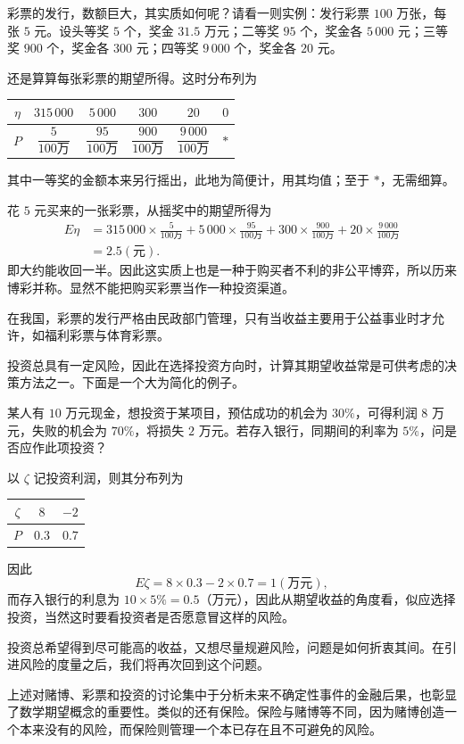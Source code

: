 \documentclass[../../main.tex]{subfiles}
\begin{document}
\begin{example}[彩票]\label{example:ch04-彩票}
彩票的发行，数额巨大，其实质如何呢？请看一则实例：发行彩票 $100$ 万张，每张 $5$ 元。设头等奖 $5$ 个，奖金 $31.5$ 万元；二等奖 $95$ 个，奖金各 $5\,000$ 元；三等奖 $900$ 个，奖金各 $300$ 元；四等奖 $9\,000$ 个，奖金各 $20$ 元。

还是算算每张彩票的期望所得。这时分布列为
\begin{center}
\begin{tabular}{c|ccccc}
$\eta$ & $315\,000$ & $5\,000$ & $300$ & $20$ & $0$\\
\hline
$P$ & $\dfrac{5}{100\text{万}}$ & $\dfrac{95}{100\text{万}}$ & $\dfrac{900}{100\text{万}}$ & $\dfrac{9\,000}{100\text{万}}$ & $*$
\end{tabular}
\end{center}
其中一等奖的金额本来另行摇出，此地为简便计，用其均值；至于 $*$，无需细算。

花 $5$ 元买来的一张彩票，从摇奖中的期望所得为
\begin{align*}
E\eta&=315\,000\times\frac{5}{100\text{万}}+5\,000\times\frac{95}{100\text{万}}
+300\times\frac{900}{100\text{万}}+20\times\frac{9\,000}{100\text{万}}\\
&=2.5(\text{元}).
\end{align*}
即大约能收回一半。因此这实质上也是一种于购买者不利的非公平博弈，所以历来博彩并称。显然不能把购买彩票当作一种投资渠道。

在我国，彩票的发行严格由民政部门管理，只有当收益主要用于公益事业时才允许，如福利彩票与体育彩票。
\end{example}

\begin{example}[投资之决策]\label{example:ch04-投资决策}
投资总具有一定风险，因此在选择投资方向时，计算其期望收益常是可供考虑的决策方法之一。下面是一个大为简化的例子。

某人有 $10$ 万元现金，想投资于某项目，预估成功的机会为 $30\%$，可得利润 $8$ 万元，失败的机会为 $70\%$，将损失 $2$ 万元。若存入银行，同期间的利率为 $5\%$，问是否应作此项投资？

以 $\zeta$ 记投资利润，则其分布列为
\begin{center}
\begin{tabular}{c|cc}
$\zeta$ & $8$ & $-2$\\
\hline
$P$ & $0.3$ & $0.7$
\end{tabular}
\end{center}
因此
\[
E\zeta=8\times 0.3-2\times 0.7=1(\text{万元}),
\]
而存入银行的利息为 $10\times 5\%=0.5$（万元），因此从期望收益的角度看，似应选择投资，当然这时要看投资者是否愿意冒这样的风险。

投资总希望得到尽可能高的收益，又想尽量规避风险，问题是如何折衷其间。在引进风险的度量之后，我们将再次回到这个问题。

上述对赌博、彩票和投资的讨论集中于分析未来不确定性事件的金融后果，也彰显了数学期望概念的重要性。类似的还有保险。保险与赌博等不同，因为赌博创造一个本来没有的风险，而保险则管理一个本已存在且不可避免的风险。
\end{example}
\end{document}
